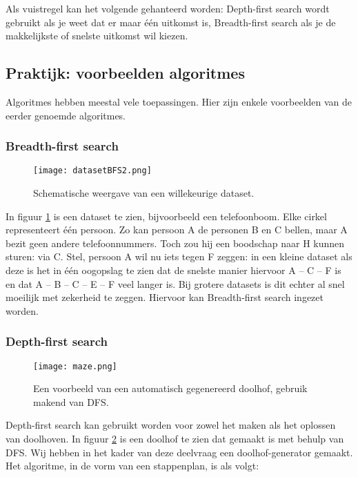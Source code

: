 Als vuistregel kan het volgende gehanteerd worden: Depth-first search wordt gebruikt als je weet dat er maar \'e\'en uitkomst is, Breadth-first search als je de makkelijkste of snelste uitkomst wil kiezen.

\subsection{Praktijk: voorbeelden algoritmes}
Algoritmes hebben meestal vele toepassingen. Hier zijn enkele voorbeelden van de eerder genoemde algoritmes.\\

\subsubsection{Breadth-first search}
\begin{figure}[H]
  \centering
    \texttt{[image: datasetBFS2.png]}
  \caption{Schematische weergave van een willekeurige dataset.}
  \label{fig:datasetBFS2}
\end{figure}

In figuur \ref{fig:datasetBFS2} is een dataset te zien, bijvoorbeeld een telefoonboom. Elke cirkel representeert \'e\'en persoon. Zo kan persoon A de personen B en C bellen, maar A bezit geen andere telefoonnummers. Toch zou hij een boodschap naar H kunnen sturen: via C. 
Stel, persoon A wil nu iets tegen F zeggen: in een kleine dataset als deze is het in \'e\'en oogopslag te zien dat de snelste manier hiervoor A – C – F is en dat A – B – C – E – F veel langer is. Bij grotere datasets is dit echter al snel moeilijk met zekerheid te zeggen. Hiervoor kan Breadth-first search ingezet worden.

\subsubsection{Depth-first search}

\begin{figure}[H]
  \centering
    \texttt{[image: maze.png]}
  \caption{Een voorbeeld van een automatisch gegenereerd doolhof, gebruik makend van DFS.}
  \label{fig:maze}
\end{figure}

Depth-first search kan gebruikt worden voor zowel het maken als het oplossen van doolhoven. In figuur \ref{fig:maze} is een doolhof te zien dat gemaakt is met behulp van DFS. Wij hebben in het kader van deze deelvraag een doolhof-generator gemaakt. Het algoritme, in de vorm van een stappenplan, is als volgt:

